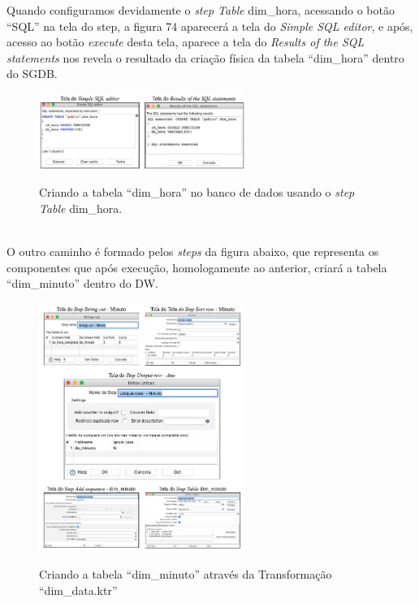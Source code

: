 Quando configuramos devidamente o \textit{step Table} dim\_hora, acessando o bot\~{a}o ``SQL'' na tela do step, 
a figura 74 aparecer\'{a} a tela do \textit{Simple SQL editor}, e ap\'{o}s, acesso ao bot\~{a}o \textit{execute} desta tela,
aparece a tela do \textit{Results of the SQL statements} nos revela o resultado da 
cria\c{c}\~{a}o f\'{i}sica da tabela ``dim\_hora'' dentro do SGDB. 

\begin{figure}[H]
	\vspace*{0,2cm}
    \centering
    \caption{Criando a tabela ``dim\_hora'' no banco de dados usando o \textit{step Table} dim\_hora.}
    \includegraphics[width=0.6\textwidth]{./04-figuras/figura-tb-dim-hora}
    \label{fig:ilustfigtbdimhora}
\end{figure}
\vspace*{-0,9cm}
{\raggedright {}} \\

O outro caminho \'{e} formado pelos \textit{steps} da figura abaixo, que representa os componentes 
que ap\'{o}s execu\c{c}\~{a}o, homologamente ao anterior, criar\'{a} a tabela ``dim\_minuto'' dentro do DW.

\begin{figure}[H]
	\vspace*{0,2cm}
    \centering
    \caption{Criando a tabela ``dim\_minuto'' atrav\'{e}s da Transforma\c{c}\~{a}o ``dim\_data.ktr''}
    \includegraphics[width=0.6\textwidth]{./04-figuras/figura-dim-minuto}
    \label{fig:ilustfigdimanodimminuto}
\end{figure}
\vspace*{-0,9cm}
{\raggedright {}} \\

